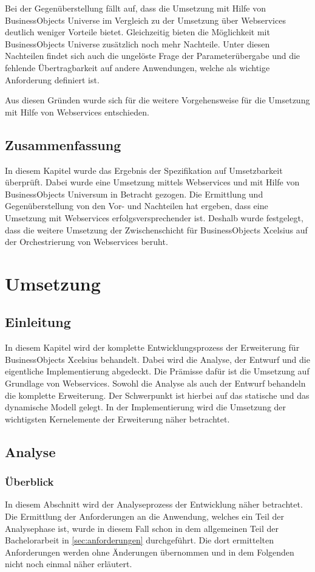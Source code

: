\begin{onehalfspacing}
Bei der Gegenüberstellung fällt auf, dass die Umsetzung mit Hilfe von BusinessObjects Universe im Vergleich zu der Umsetzung über Webservices deutlich weniger Vorteile bietet. Gleichzeitig bieten die Möglichkeit mit BusinessObjects Universe zusätzlich noch mehr Nachteile. Unter diesen Nachteilen findet sich auch die ungelöste Frage der Parameterübergabe und die fehlende Übertragbarkeit auf andere Anwendungen, welche als wichtige Anforderung definiert ist.

Aus diesen Gründen wurde sich für die weitere Vorgehensweise für die Umsetzung mit Hilfe von Webservices entschieden.

\section{Zusammenfassung}
In diesem Kapitel wurde das Ergebnis der Spezifikation auf Umsetzbarkeit überprüft. Dabei wurde eine Umsetzung mittels Webservices  und mit Hilfe von BusinessObjects Universum in Betracht gezogen. Die Ermittlung und Gegenüberstellung von den Vor- und Nachteilen hat ergeben, dass eine Umsetzung mit Webservices erfolgsversprechender ist. Deshalb wurde festgelegt, dass die weitere Umsetzung der Zwischenschicht für BusinessObjects Xcelsius auf der Orchestrierung von Webservices beruht.

\chapter{Umsetzung}

\section{Einleitung}
In diesem Kapitel wird der komplette Entwicklungsprozess der Erweiterung für BusinessObjects Xcelsius behandelt. Dabei wird die Analyse, der Entwurf und die eigentliche Implementierung abgedeckt. Die Prämisse dafür ist die Umsetzung auf Grundlage von Webservices. Sowohl die Analyse als auch der Entwurf behandeln die komplette Erweiterung. Der Schwerpunkt ist hierbei auf das statische und das dynamische Modell gelegt. In der Implementierung wird die Umsetzung der wichtigsten Kernelemente der Erweiterung näher betrachtet.

\section{Analyse}

\subsection{Überblick}
In diesem Abschnitt wird der Analyseprozess der Entwicklung näher betrachtet. Die Ermittlung der Anforderungen an die Anwendung, welches ein Teil der Analysephase ist, wurde in diesem Fall schon in dem allgemeinen Teil der Bachelorarbeit in \vref{sec:anforderungen} durchgeführt. Die dort ermittelten Anforderungen werden ohne Änderungen übernommen und in dem Folgenden nicht noch einmal näher erläutert.


\end{onehalfspacing}
